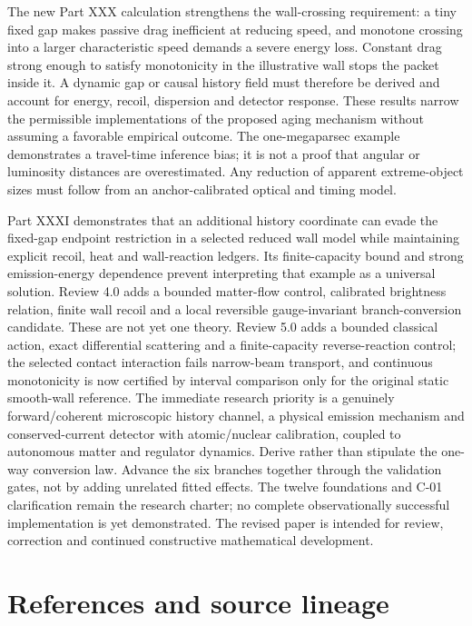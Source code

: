 \documentclass[
  11pt,
  twoside]{article}
\begin{document}
The new Part XXX calculation strengthens the wall-crossing requirement:
a tiny fixed gap makes passive drag inefficient at reducing speed, and
monotone crossing into a larger characteristic speed demands a severe
energy loss. Constant drag strong enough to satisfy monotonicity in the
illustrative wall stops the packet inside it. A dynamic gap or causal
history field must therefore be derived and account for energy, recoil,
dispersion and detector response. These results narrow the permissible
implementations of the proposed aging mechanism without assuming a
favorable empirical outcome. The one-megaparsec example demonstrates a
travel-time inference bias; it is not a proof that angular or luminosity
distances are overestimated. Any reduction of apparent extreme-object
sizes must follow from an anchor-calibrated optical and timing model.

Part XXXI demonstrates that an additional history coordinate can evade
the fixed-gap endpoint restriction in a selected reduced wall model
while maintaining explicit recoil, heat and wall-reaction ledgers. Its
finite-capacity bound and strong emission-energy dependence prevent
interpreting that example as a universal solution. Review 4.0 adds a
bounded matter-flow control, calibrated brightness relation, finite wall
recoil and a local reversible gauge-invariant branch-conversion
candidate. These are not yet one theory. Review 5.0 adds a bounded
classical action, exact differential scattering and a finite-capacity
reverse-reaction control; the selected contact interaction fails
narrow-beam transport, and continuous monotonicity is now certified by
interval comparison only for the original static smooth-wall reference.
The immediate research priority is a genuinely forward/coherent
microscopic history channel, a physical emission mechanism and
conserved-current detector with atomic/nuclear calibration, coupled to
autonomous matter and regulator dynamics. Derive rather than stipulate
the one-way conversion law. Advance the six branches together through
the validation gates, not by adding unrelated fitted effects. The twelve
foundations and C-01 clarification remain the research charter; no
complete observationally successful implementation is yet demonstrated.
The revised paper is intended for review, correction and continued
constructive mathematical development.

\section{References and source
lineage}\label{references-and-source-lineage}
\end{document}
